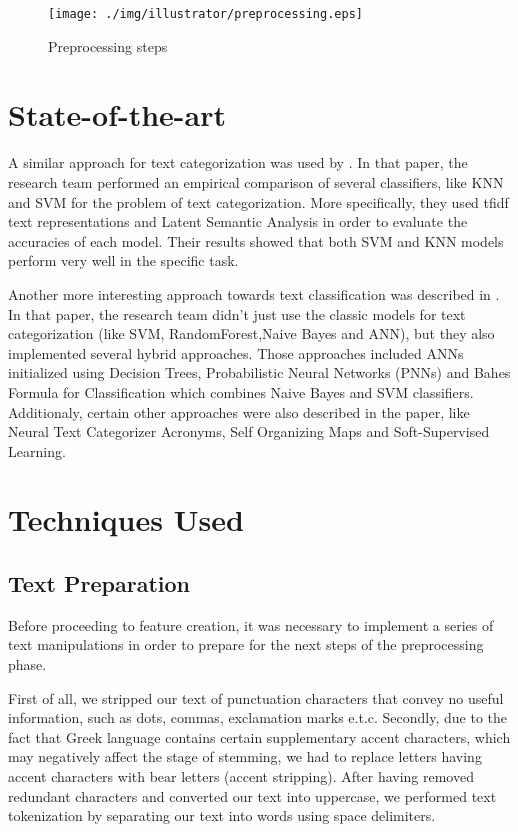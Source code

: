 \documentclass[10pt,journal,compsoc]{IEEEtran}
\begin{document}
\begin{figure}[!t]
	\centering
	\texttt{[image: ./img/illustrator/preprocessing.eps]}
	\caption{Preprocessing steps}
	\label{preprocessing}
\end{figure}

\section{State-of-the-art}
A similar approach for text categorization was used
by \cite{a3}.
In that paper, the research team performed
an empirical comparison of several classifiers, like KNN
and SVM for the problem of text categorization.
More specifically, they used tfidf text representations
and Latent Semantic Analysis in order to evaluate the accuracies
of each model.
Their results showed that both SVM and KNN models perform
very well in the specific task.

Another more interesting approach towards text classification
was described in \cite{a4}.
In that paper, the research team didn't just use the classic
models for text categorization (like SVM, RandomForest,Naive
Bayes and ANN), but they also implemented several hybrid
approaches.
Those approaches included ANNs initialized using Decision
Trees, Probabilistic Neural Networks (PNNs) and Bahes
Formula for Classification which combines Naive Bayes
and SVM classifiers.
Additionaly, certain other approaches were also described
in the paper, like Neural Text Categorizer Acronyms,
Self Organizing Maps and Soft-Supervised Learning.

\section{Techniques Used}
\subsection{Text Preparation}
Before proceeding to feature creation, it was necessary to
implement a series of text manipulations in order to
prepare for the next steps of the preprocessing phase.

First of all, we stripped our text of punctuation characters 
that convey no useful information, such as dots, commas,
exclamation marks e.t.c.
Secondly, due to the fact that Greek language contains
certain supplementary accent characters, which may negatively
affect the stage of stemming, we had to
replace letters having accent characters with bear letters (accent stripping).
After having removed redundant characters and converted
our text into uppercase, we performed text tokenization
by separating our text into words using space delimiters.
\end{document}

